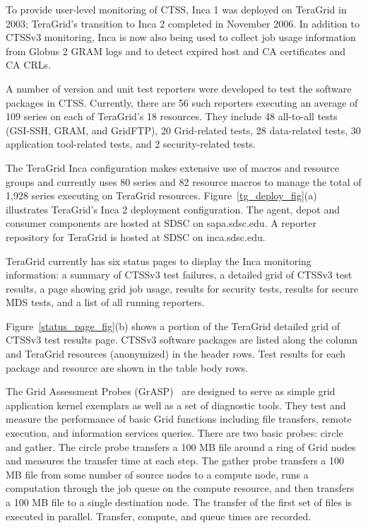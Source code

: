 \documentclass[times,10pt,twocolumn]{article}
\begin{document}
To provide user-level monitoring of CTSS, Inca 1 was deployed on TeraGrid in
2003; TeraGrid's transition to Inca 2 completed in
November 2006.  In addition to CTSSv3 monitoring, Inca is now also being used
to collect job usage information from Globus 2 GRAM logs and to detect expired
host and CA certificates and CA CRLs. 

A number of version and unit test reporters were developed to test the software packages in CTSS.
Currently, there are 56 such reporters executing an average of 109 series on
each of TeraGrid's 18 resources.  They include 48 all-to-all tests (GSI-SSH,
GRAM, and GridFTP), 20 Grid-related tests, 28 data-related tests, 30
application tool-related tests, and 2 security-related tests.  

The TeraGrid
Inca configuration makes extensive use of macros and resource groups and
currently uses 80 series and 82 resource macros to manage the total of 1,928
series executing on TeraGrid resources.
Figure~\ref{tg_deploy_fig}(a) illustrates TeraGrid's Inca 2 deployment
configuration.  The
agent, depot and consumer components are hosted at SDSC on 
sapa.sdsc.edu.  A reporter repository for TeraGrid is hosted
at SDSC on inca.sdsc.edu.  

TeraGrid currently has six status pages to display the Inca monitoring
information: a summary of CTSSv3 test failures, a detailed grid of CTSSv3 test
results, a page showing grid job
usage, results for security tests, results for secure MDS tests, and a list of
all running reporters.

Figure~\ref{status_page_fig}(b) shows a portion of the TeraGrid detailed grid of
CTSSv3 test results
page.  CTSSv3 software packages are listed along the column and TeraGrid
resources (anonymized) in the header rows.  Test results for each package and
resource are shown in the table body rows.

\label{grasp}

The Grid Assessment Probes (GrASP)~\cite{grasp} are designed to 
serve as simple grid application kernel exemplars as well as a 
set of diagnostic tools. They test and measure the performance of 
basic Grid functions including file transfers, remote execution, 
and information services queries.  There are two basic probes: circle and 
gather.  The circle probe transfers a 100 MB file around a ring of
Grid nodes and measures the transfer time at each step.  The gather probe
transfers a 100 MB file from some number of source nodes to a compute node,
runs a computation through the job queue on the compute resource, and then
transfers a 100 MB file to a single destination node.  The transfer of the
first set of files is executed in parallel.  Transfer, compute, and queue times are recorded.
\end{document}
